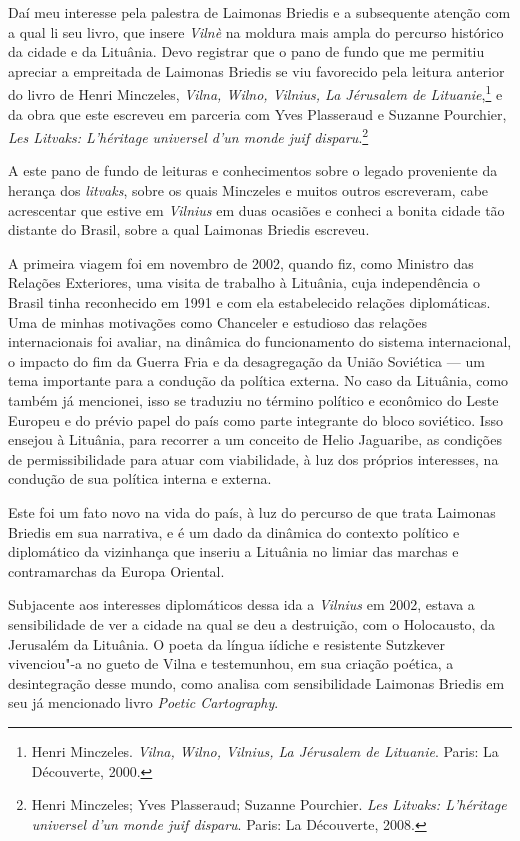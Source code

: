 Daí meu interesse pela palestra de Laimonas Briedis e a subsequente
atenção com a qual li seu livro, que insere \textit{Vilnè} na moldura mais ampla
do percurso histórico da cidade e da Lituânia. Devo registrar que o pano
de fundo que me permitiu apreciar a empreitada de Laimonas Briedis se
viu favorecido pela leitura anterior do livro de Henri Minczeles,
\textit{Vilna, Wilno, \textit{Vilnius}, La Jérusalem de Lituanie},\footnote{Henri
  Minczeles. \textit{Vilna, Wilno, \textit{Vilnius}, La Jérusalem de Lituanie}. Paris: La Découverte, 2000.} e da obra que este escreveu em
parceria com Yves Plasseraud e Suzanne Pourchier, \textit{Les Litvaks: 
L'héritage universel d'un monde juif disparu}.\footnote{Henri Minczeles;
  Yves Plasseraud; Suzanne Pourchier. \textit{Les Litvaks: L'héritage universel d'un monde juif disparu}. Paris: La Découverte, 2008.}

A este pano de fundo de leituras e conhecimentos sobre o legado
proveniente da herança dos \textit{litvaks}, sobre os quais Minczeles e
muitos outros escreveram, cabe acrescentar que estive em \textit{Vilnius} em
duas ocasiões e conheci a bonita cidade tão distante do Brasil, sobre a
qual Laimonas Briedis escreveu.

A primeira viagem foi em novembro de 2002, quando fiz, como Ministro das
Relações Exteriores, uma visita de trabalho à Lituânia, cuja
independência o Brasil tinha reconhecido em 1991 e com ela estabelecido
relações diplomáticas. Uma de minhas motivações como Chanceler e
estudioso das relações internacionais foi avaliar, na dinâmica do
funcionamento do sistema internacional, o impacto do fim da Guerra Fria
e da desagregação da União Soviética --- um tema importante para a
condução da política externa. No caso da Lituânia, como também já
mencionei, isso se traduziu no término político e econômico do Leste
Europeu e do prévio papel do país como parte integrante do bloco
soviético. Isso ensejou à Lituânia, para recorrer a um conceito de Helio
Jaguaribe, as condições de permissibilidade para atuar com viabilidade,
à luz dos próprios interesses, na condução de sua política interna e
externa.

Este foi um fato novo na vida do país, à luz do percurso de que trata
Laimonas Briedis em sua narrativa, e é um dado da dinâmica do contexto
político e diplomático da vizinhança que inseriu a Lituânia no limiar
das marchas e contramarchas da Europa Oriental.

Subjacente aos interesses diplomáticos dessa ida a \textit{Vilnius} em 2002,
estava a sensibilidade de ver a cidade na qual se deu a destruição, com
o Holocausto, da Jerusalém da Lituânia. O poeta da língua iídiche e
resistente Sutzkever vivenciou"-a no gueto de Vilna e testemunhou, em sua
criação poética, a desintegração desse mundo, como analisa com
sensibilidade Laimonas Briedis em seu já mencionado livro \textit{Poetic
Cartography}.


